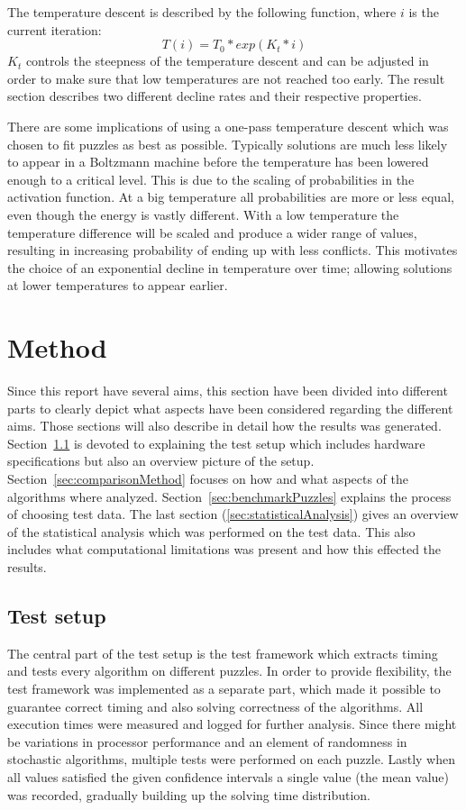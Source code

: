 \documentclass[a4paper,11pt]{kth-mag}
\begin{document}
The temperature descent is described by the following function, where $i$ is the current iteration:
\[
T(i) = T_0 * exp(K_t * i)
\]
$K_t$ controls the steepness of the temperature descent and can be adjusted in order to make sure that low temperatures are not reached too early.
The result section describes two different decline rates and their respective properties.

There are some implications of using a one-pass temperature descent which was chosen to fit puzzles as best as possible.
Typically solutions are much less likely to appear in a Boltzmann machine before the temperature has been lowered enough to a critical level.
This is due to the scaling of probabilities in the activation function.
At a big temperature all probabilities are more or less equal, even though the energy is vastly different.
With a low temperature the temperature difference will be scaled and produce a wider range of values, resulting in increasing probability of ending up with less conflicts.
This motivates the choice of an exponential decline in temperature over time; allowing solutions at lower temperatures to appear earlier.

\chapter{Method}
Since this report have several aims, this section have been divided into different parts to clearly depict what aspects have been considered regarding the different aims. 
Those sections will also describe in detail how the results was generated. 
Section~\ref{sec:testSetupMethod} is devoted to explaining the test setup which includes hardware specifications but also an overview picture of the setup. 
Section~\ref{sec:comparisonMethod} focuses on how and what aspects of the algorithms where analyzed.
Section~\ref{sec:benchmarkPuzzles} explains the process of choosing test data.
The last section (\ref{sec:statisticalAnalysis}) gives an overview of the statistical analysis which was performed on the test data.
This also includes what computational limitations was present and how this effected the results. 

\FloatBarrier
\section{Test setup}
\label{sec:testSetupMethod}
The central part of the test setup is the test framework which extracts timing and tests every algorithm on different puzzles. 
In order to provide flexibility, the test framework was implemented as a separate part, which made it possible to guarantee correct timing and also solving correctness of the algorithms.
All execution times were measured and logged for further analysis.
Since there might be variations in processor performance and an element of randomness in stochastic algorithms, multiple tests were performed on each puzzle. 
Lastly when all values satisfied the given confidence intervals a single value (the mean value) was recorded, gradually building up the solving time distribution.
\end{document}
